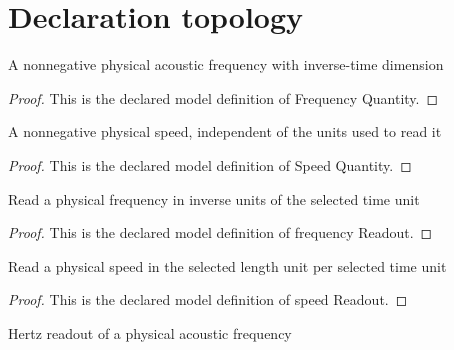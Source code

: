 \section{Declaration topology}
\begin{definition}
  \label{def:physics:phyx-mini-0324:phyxminiproblems-problemphyxmini0324-frequencyquantity}
  A nonnegative physical acoustic frequency with inverse-time dimension
\end{definition}
\begin{proof}
  This is the declared model definition of Frequency Quantity.
\end{proof}
\begin{definition}
  \label{def:physics:phyx-mini-0324:phyxminiproblems-problemphyxmini0324-speedquantity}
  A nonnegative physical speed, independent of the units used to read it
\end{definition}
\begin{proof}
  This is the declared model definition of Speed Quantity.
\end{proof}
\begin{definition}
  \label{def:physics:phyx-mini-0324:phyxminiproblems-problemphyxmini0324-frequencyreadout}
  Read a physical frequency in inverse units of the selected time unit
\end{definition}
\begin{proof}
  This is the declared model definition of frequency Readout.
\end{proof}
\begin{definition}
  \label{def:physics:phyx-mini-0324:phyxminiproblems-problemphyxmini0324-speedreadout}
  Read a physical speed in the selected length unit per selected time unit
\end{definition}
\begin{proof}
  This is the declared model definition of speed Readout.
\end{proof}
\begin{definition}
  \label{def:physics:phyx-mini-0324:phyxminiproblems-problemphyxmini0324-frequencyinhertz}
  Hertz readout of a physical acoustic frequency
\end{definition}

